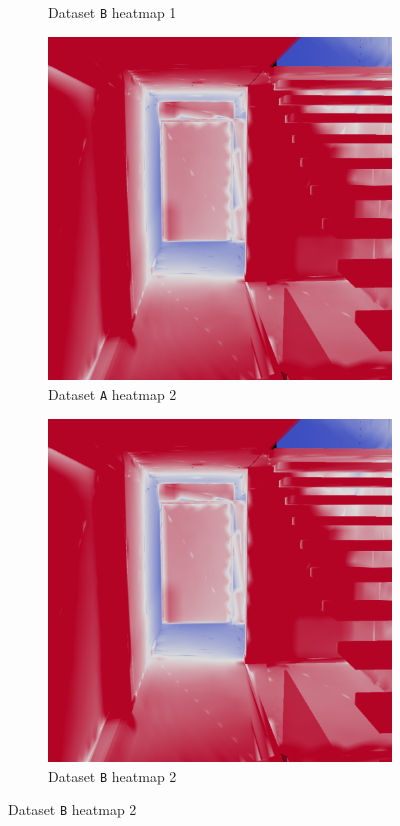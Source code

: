 \begin{figure}
\begin{subfigure}[t]{0.24\linewidth}
		\caption{Dataset \texttt{B} heatmap 1}
	\end{subfigure}
	\begin{subfigure}[t]{0.24\linewidth}
		\includegraphics[width=\textwidth]{chapters/chapter_results/correct2heatmap2}
		\caption{Dataset \texttt{A} heatmap 2}
	\end{subfigure}
	\begin{subfigure}[t]{0.24\linewidth}
		\includegraphics[width=\textwidth]{chapters/chapter_results/wrong2heatmap2}
		\caption{Dataset \texttt{B} heatmap 2}
	\end{subfigure}


\end{figure}
